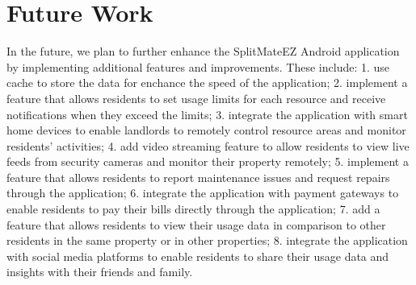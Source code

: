 \documentclass[sigconf,nonacm]{acmart}\settopmatter{printfolios=true}
\begin{document}
\section{Future Work}
In the future, we plan to further enhance the SplitMateEZ Android application by implementing additional features and improvements. These include: 1. use cache to store the data for enchance the speed of the application; 2. implement a feature that allows residents to set usage limits for each resource and receive notifications when they exceed the limits; 3. integrate the application with smart home devices to enable landlords to remotely control resource areas and monitor residents' activities; 4. add video streaming feature to allow residents to view live feeds from security cameras and monitor their property remotely; 5. implement a feature that allows residents to report maintenance issues and request repairs through the application; 6. integrate the application with payment gateways to enable residents to pay their bills directly through the application; 7. add a feature that allows residents to view their usage data in comparison to other residents in the same property or in other properties; 8. integrate the application with social media platforms to enable residents to share their usage data and insights with their friends and family.











\end{document}

